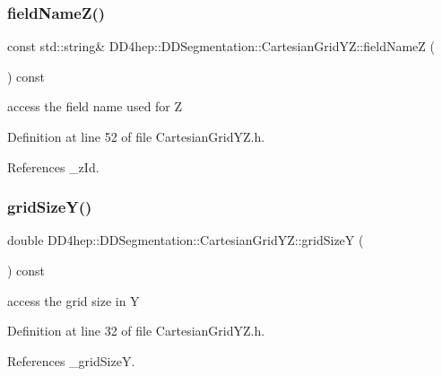 \subsubsection{\texorpdfstring{field\+Name\+Z()}{fieldNameZ()}}
{\footnotesize\ttfamily const std\+::string\& D\+D4hep\+::\+D\+D\+Segmentation\+::\+Cartesian\+Grid\+Y\+Z\+::field\+NameZ (\begin{DoxyParamCaption}{ }\end{DoxyParamCaption}) const\hspace{0.3cm}{\ttfamily [inline]}}



access the field name used for Z 



Definition at line 52 of file Cartesian\+Grid\+Y\+Z.\+h.



References \+\_\+z\+Id.

\hypertarget{class_d_d4hep_1_1_d_d_segmentation_1_1_cartesian_grid_y_z_a067d19fa48e92f2159f033a48a6fe787}{}\label{class_d_d4hep_1_1_d_d_segmentation_1_1_cartesian_grid_y_z_a067d19fa48e92f2159f033a48a6fe787} 
\subsubsection{\texorpdfstring{grid\+Size\+Y()}{gridSizeY()}}
{\footnotesize\ttfamily double D\+D4hep\+::\+D\+D\+Segmentation\+::\+Cartesian\+Grid\+Y\+Z\+::grid\+SizeY (\begin{DoxyParamCaption}{ }\end{DoxyParamCaption}) const\hspace{0.3cm}{\ttfamily [inline]}}



access the grid size in Y 



Definition at line 32 of file Cartesian\+Grid\+Y\+Z.\+h.



References \+\_\+grid\+SizeY.

\hypertarget{class_d_d4hep_1_1_d_d_segmentation_1_1_cartesian_grid_y_z_a2e79c0363e46beee0014715e6daf7f95}{}\label{class_d_d4hep_1_1_d_d_segmentation_1_1_cartesian_grid_y_z_a2e79c0363e46beee0014715e6daf7f95} 
